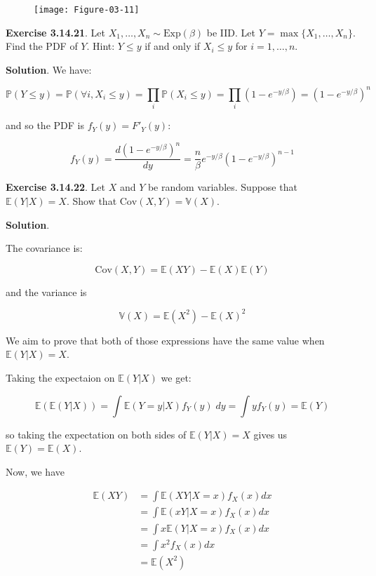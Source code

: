 \begin{figure}[H]
\texttt{[image: Figure-03-11]}
\end{figure}

\textbf{Exercise 3.14.21}. Let
\(X_1, \dots, X_n \sim \text{Exp}(\beta)\) be IID. Let
\(Y = \max \{ X_1, \dots, X_n \}\). Find the PDF of \(Y\). Hint:
\(Y \leq y\) if and only if \(X_i \leq y\) for \(i = 1, \dots, n\).

\textbf{Solution}. We have:

\[ \mathbb{P}(Y \leq y) = \mathbb{P}(\forall i, X_i \leq y) = \prod_i \mathbb{P}(X_i \leq y) = \prod_i \left(1 - e^{-y/\beta}\right) = (1 - e^{-y/\beta})^n \]

and so the PDF is \(f_Y(y) = F'_Y(y)\):

\[ f_Y(y) = \frac{d (1 - e^{-y/\beta})^n}{dy} = \frac{n}{\beta} e^{-y/\beta} (1 - e^{-y/\beta})^{n-1}\]

\textbf{Exercise 3.14.22}. Let \(X\) and \(Y\) be random variables.
Suppose that \(\mathbb{E}(Y | X) = X\). Show that
\(\text{Cov}(X, Y) = \mathbb{V}(X)\).

\textbf{Solution}.

The covariance is:

\[ \text{Cov}(X, Y) = \mathbb{E}(XY) - \mathbb{E}(X) \mathbb{E}(Y) \]

and the variance is

\[ \mathbb{V}(X) = \mathbb{E}(X^2) - \mathbb{E}(X)^2 \]

We aim to prove that both of those expressions have the same value when
\(\mathbb{E}(Y | X) = X\).

Taking the expectaion on \(\mathbb{E}(Y | X)\) we get:

\[ \mathbb{E}(\mathbb{E}(Y | X)) = \int \mathbb{E}(Y = y | X) f_Y(y) \; dy = \int y f_Y(y) = \mathbb{E}(Y) \]

so taking the expectation on both sides of \(\mathbb{E}(Y | X) = X\)
gives us \(\mathbb{E}(Y) = \mathbb{E}(X)\).

Now, we have

\begin{align}
\mathbb{E}(XY) &= \int \mathbb{E}(XY | X = x) f_X(x) dx \\
&= \int \mathbb{E}(xY | X = x) f_X(x) dx \\
&= \int x \mathbb{E}(Y | X = x) f_X(x) dx \\
&= \int x^2 f_X(x) dx \\
&= \mathbb{E}(X^2)
\end{align}

